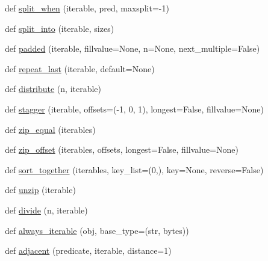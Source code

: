 \begin{DoxyCompactItemize}
def \hyperlink{namespacesetuptools_1_1__vendor_1_1more__itertools_1_1more_ae26b0d8a7973334ba9a01860d90dc031}{split\+\_\+when} (iterable, pred, maxsplit=-\/1)
\item 
def \hyperlink{namespacesetuptools_1_1__vendor_1_1more__itertools_1_1more_a5ed35ee953b8004cf902dcd7b31714f3}{split\+\_\+into} (iterable, sizes)
\item 
def \hyperlink{namespacesetuptools_1_1__vendor_1_1more__itertools_1_1more_a47d774718336d9c7ce26b793293948ad}{padded} (iterable, fillvalue=None, n=None, next\+\_\+multiple=False)
\item 
def \hyperlink{namespacesetuptools_1_1__vendor_1_1more__itertools_1_1more_adb278421baa6650376378b987f55c932}{repeat\+\_\+last} (iterable, default=None)
\item 
def \hyperlink{namespacesetuptools_1_1__vendor_1_1more__itertools_1_1more_a263804d0fc0b058f793cc590eca76edd}{distribute} (n, iterable)
\item 
def \hyperlink{namespacesetuptools_1_1__vendor_1_1more__itertools_1_1more_a4e0e2708002360a3ab878c2e2e56e0af}{stagger} (iterable, offsets=(-\/1, 0, 1), longest=False, fillvalue=None)
\item 
def \hyperlink{namespacesetuptools_1_1__vendor_1_1more__itertools_1_1more_aa0064ebbb74dbab5162e2411a17b9a32}{zip\+\_\+equal} (iterables)
\item 
def \hyperlink{namespacesetuptools_1_1__vendor_1_1more__itertools_1_1more_a1b18ea084d883c1c86c2a3d018fa93f8}{zip\+\_\+offset} (iterables, offsets, longest=False, fillvalue=None)
\item 
def \hyperlink{namespacesetuptools_1_1__vendor_1_1more__itertools_1_1more_afc1ec28544ee515336f9adb89ddd1652}{sort\+\_\+together} (iterables, key\+\_\+list=(0,), key=None, reverse=False)
\item 
def \hyperlink{namespacesetuptools_1_1__vendor_1_1more__itertools_1_1more_a21fdb959c73b5d1418b18a789dd0e138}{unzip} (iterable)
\item 
def \hyperlink{namespacesetuptools_1_1__vendor_1_1more__itertools_1_1more_a18f0983503e4bb346c7d1e1fb9d929fc}{divide} (n, iterable)
\item 
def \hyperlink{namespacesetuptools_1_1__vendor_1_1more__itertools_1_1more_a83c94aeea028d3c3c84c578919dc9e0b}{always\+\_\+iterable} (obj, base\+\_\+type=(str, bytes))
\item 
def \hyperlink{namespacesetuptools_1_1__vendor_1_1more__itertools_1_1more_a90ed10a67aaf4c8c26a8b906d111a904}{adjacent} (predicate, iterable, distance=1)
\item 

\end{DoxyCompactItemize}
